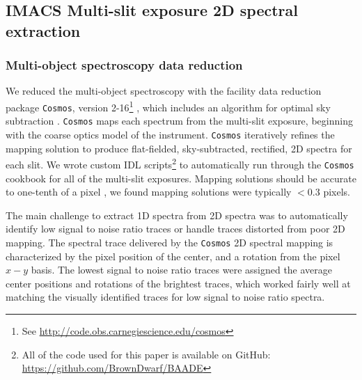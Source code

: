 \subsection{IMACS Multi-slit exposure 2D spectral extraction}
\subsubsection{Multi-object spectroscopy data reduction}
We reduced the multi-object spectroscopy with the facility data reduction package \texttt{Cosmos}, version 2-16\footnote{See \url{http://code.obs.carnegiescience.edu/cosmos}} \citep{2011PASP..123..288D}, which includes an algorithm for optimal sky subtraction \citep{2003PASP..115..688K}.  \texttt{Cosmos} maps each spectrum from the multi-slit exposure, beginning with the coarse optics model of the instrument.  \texttt{Cosmos} iteratively refines the mapping solution to produce flat-fielded, sky-subtracted, rectified, 2D spectra for each slit.  We wrote custom IDL scripts\footnote{All of the code used for this paper is available on GitHub: \url{https://github.com/BrownDwarf/BAADE}} to automatically run through the \texttt{Cosmos} cookbook for all of the multi-slit exposures.  Mapping solutions should be accurate to one-tenth of a pixel \citep{2011PASP..123..288D}, we found mapping solutions were typically $<0.3$ pixels.

The main challenge to extract 1D spectra from 2D spectra was to automatically identify low signal to noise ratio traces or handle traces distorted from poor 2D mapping.  The spectral trace delivered by the \texttt{Cosmos} 2D spectral mapping is characterized by the pixel position of the center, and a rotation from the pixel $x-y$ basis.  The lowest signal to noise ratio traces were assigned the average center positions and rotations of the brightest traces, which worked fairly well at matching the visually identified traces for low signal to noise ratio spectra.

